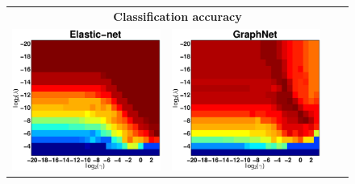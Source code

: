 \newcommand{\addhspace}{\hspace{0.04\linewidth}}
\begin{figure}[t]
	\setlength{\tabcolsep}{1pt} 
	\renewcommand{\imwidth}  {0.3\linewidth}
	\renewcommand{\imheight}  {0.3105\linewidth}	
	\begin{tabular}{cccc}	
	\multicolumn{4}{c}{{\textbf{\large{Classification accuracy}}}} \vspace{0pt} \\
	\includegraphics[width=\imwidth,height=\imheight]{exp_gridsearch_acc_enet.pdf} &
	\includegraphics[width=\imwidth,height=\imheight]{exp_gridsearch_acc_gnet.pdf} &

\end{tabular}
\end{figure}
